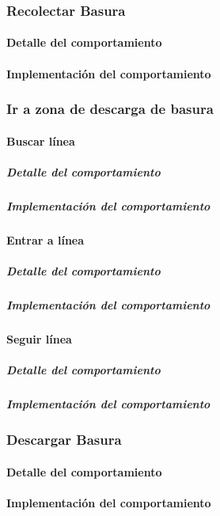 \subsubsection{Recolectar Basura}
\label{collect_garbage}
\paragraph{Detalle del comportamiento}
\paragraph{Implementaci\'on del comportamiento}

\subsubsection{Ir a zona de descarga de basura}
\label{go_to_unload_zone}

\paragraph{Buscar l\'inea}
\label{find_line}
\subparagraph{Detalle del comportamiento}
\subparagraph{Implementaci\'on del comportamiento}

\paragraph{Entrar a l\'inea}
\label{enter_line}
\subparagraph{Detalle del comportamiento}
\subparagraph{Implementaci\'on del comportamiento}

\paragraph{Seguir l\'inea}
\label{follow_line}
\subparagraph{Detalle del comportamiento}
\subparagraph{Implementaci\'on del comportamiento}

\subsubsection{Descargar Basura}
\label{unload_garbage}
\paragraph{Detalle del comportamiento}
\paragraph{Implementaci\'on del comportamiento}

